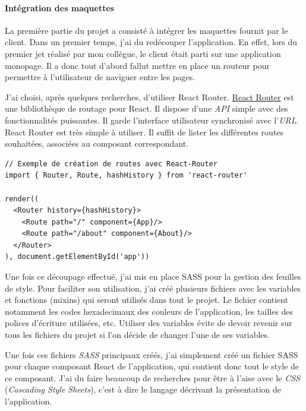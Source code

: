 \bigskip

\paragraph{Intégration des
maquettes}\label{intuxe9gration-des-maquettes}

\bigskip

La première partie du projet a consisté à intégrer les maquettes fournit
par le client. Dans un premier temps, j'ai du redécouper l'application.
En effet, lors du premier jet réalisé par mon collègue, le client était
parti sur une application monopage. Il a donc tout d'abord fallut mettre
en place un routeur pour permettre à l'utilisateur de naviguer entre les
pages.

\bigskip

J'ai choisi, après quelques recherches, d'utiliser React Router.
\href{https://github.com/ReactTraining/react-router}{React Router} est
une bibliothèque de routage pour React. Il dispose d'une \emph{API}
simple avec des fonctionnalités puissantes. Il garde l'interface
utilisateur synchronisé avec l'\emph{URL}. React Router est très simple
à utiliser. Il suffit de lister les différentes routes souhaitées,
associées au composant correspondant.

\begin{verbatim}
// Exemple de création de routes avec React-Router
import { Router, Route, hashHistory } from 'react-router'

render((
  <Router history={hashHistory}>
    <Route path="/" component={App}/>
    <Route path="/about" component={About}/>
  </Router>
), document.getElementById('app'))
\end{verbatim}

\bigskip

Une fois ce découpage effectué, j'ai mis en place SASS pour la gestion
des feuilles de style. Pour faciliter son utilisation, j'ai créé
plusieurs fichiers avec les variables et fonctions (mixins) qui seront
utilisés dans tout le projet. Le fichier contient notamment les codes
hexadecimaux des couleurs de l'application, les tailles des polices
d'écriture utilisées, etc. Utiliser des variables évite de devoir
revenir sur tous les fichiers du projet si l'on décide de changer l'une
de ses variables.

\bigskip

Une fois ces fichiers \emph{SASS} principaux créés, j'ai simplement créé
un fichier SASS pour chaque composant React de l'application, qui
contient donc tout le style de ce composant. J'ai du faire beaucoup de
recherches pour être à l'aise avec le \emph{CSS} (\emph{Cascading Style
Sheets}), c'est à dire le langage décrivant la présentation de
l'application.


